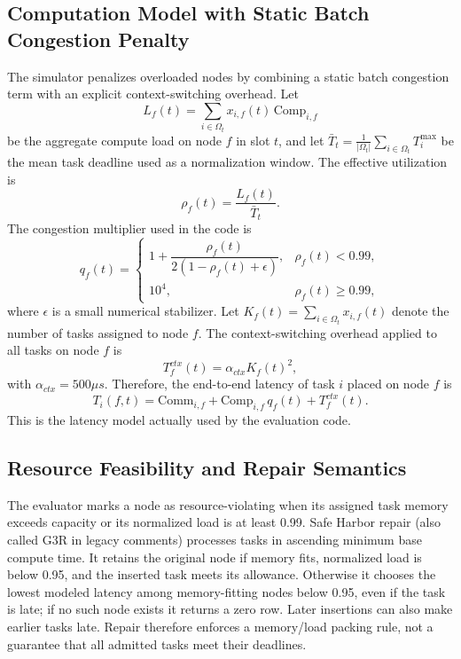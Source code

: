 \documentclass[pdflatex,sn-mathphys-num]{sn-jnl}
\begin{document}
\subsection{Computation Model with Static Batch Congestion Penalty}
The simulator penalizes overloaded nodes by combining a static batch congestion term with an explicit context-switching overhead. Let
\begin{equation}
    L_f(t) = \sum_{i \in \Omega_t} x_{i,f}(t)\,\mathrm{Comp}_{i,f}
\end{equation}
be the aggregate compute load on node $f$ in slot $t$, and let $\bar{T}_t=\frac{1}{|\Omega_t|}\sum_{i \in \Omega_t} T_i^{\max}$ be the mean task deadline used as a normalization window. The effective utilization is
\begin{equation}
    \rho_f(t) = \frac{L_f(t)}{\bar{T}_t}.
\end{equation}
The congestion multiplier used in the code is
\begin{equation}
    q_f(t) =
    \begin{cases}
        1 + \dfrac{\rho_f(t)}{2(1-\rho_f(t)+\epsilon)}, & \rho_f(t) < 0.99,\\
        10^4, & \rho_f(t) \ge 0.99,
    \end{cases}
\end{equation}
where $\epsilon$ is a small numerical stabilizer. Let $K_f(t)=\sum_{i \in \Omega_t} x_{i,f}(t)$ denote the number of tasks assigned to node $f$. The context-switching overhead applied to all tasks on node $f$ is
\begin{equation}
    T_f^{ctx}(t) = \alpha_{ctx} K_f(t)^2,
\end{equation}
with $\alpha_{ctx}=500\mu s$. Therefore, the end-to-end latency of task $i$ placed on node $f$ is
\begin{equation}
    T_i(f,t) = \mathrm{Comm}_{i,f} + \mathrm{Comp}_{i,f}\, q_f(t) + T_f^{ctx}(t).
\end{equation}
This is the latency model actually used by the evaluation code.

\subsection{Resource Feasibility and Repair Semantics}
The evaluator marks a node as resource-violating when its assigned task memory exceeds capacity or its normalized load is at least 0.99. Safe Harbor repair (also called G3R in legacy comments) processes tasks in ascending minimum base compute time. It retains the original node if memory fits, normalized load is below 0.95, and the inserted task meets its allowance. Otherwise it chooses the lowest modeled latency among memory-fitting nodes below 0.95, even if the task is late; if no such node exists it returns a zero row. Later insertions can also make earlier tasks late. Repair therefore enforces a memory/load packing rule, not a guarantee that all admitted tasks meet their deadlines.
\end{document}
